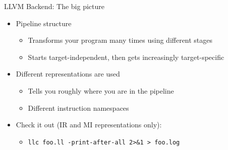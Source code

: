 \begin{frame}{LLVM Backend: The big picture}

\begin{itemize}
    \item Pipeline structure
    \begin{itemize}
        \item Transforms your program many times using different stages
        \item Starts target-independent, then gets increasingly target-specific
    \end{itemize}
    \item Different representations are used
    \begin{itemize}
        \item Tells you roughly where you are in the pipeline
        \item Different instruction namespaces
    \end{itemize}
    \item Check it out (IR and MI representations only):
    \begin{itemize}
        \item \texttt{llc foo.ll -print-after-all 2>\&1 > foo.log}
    \end{itemize}
\end{itemize}


\end{frame}


